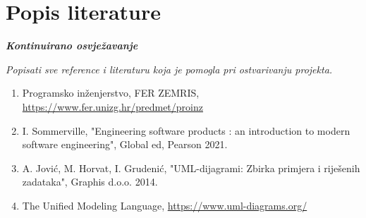 \chapter*{Popis literature}
	 	
 		\textbf{\textit{Kontinuirano osvježavanje}}
	
		\textit{Popisati sve reference i literaturu koja je pomogla pri ostvarivanju projekta.}
		
		
		\begin{enumerate}
			
			
			\item  Programsko inženjerstvo, FER ZEMRIS, \url{https://www.fer.unizg.hr/predmet/proinz}
			
			\item  I. Sommerville, "Engineering software products : an introduction to modern software engineering", Global ed, Pearson 2021.
			
			\item  A. Jović, M. Horvat, I. Grudenić, "UML-dijagrami: Zbirka primjera i riješenih zadataka", Graphis d.o.o. 2014.
			
			\item  The Unified Modeling Language, \url{https://www.uml-diagrams.org/}
		\end{enumerate}
		
		 
